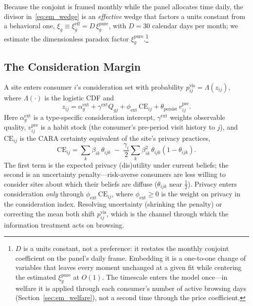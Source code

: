 \documentclass[12pt]{article}
\theoremstyle{definition}
\newcommand{\CE}{\text{CE}}
\theoremstyle{remark}
\begin{document}
Because the conjoint is framed monthly while the panel allocates time daily, the divisor in~\eqref{eq:em_wedge} is an \emph{effective} wedge that factors a units constant from a behavioral one, $\xi_g \equiv \xi^{\text{eff}}_g = D\,\xi^{\text{pure}}_g$, with $D = 30$ calendar days per month; we estimate the dimensionless paradox factor $\xi^{\text{pure}}_g$.\footnote{$D$ is a units constant, not a preference: it restates the monthly conjoint coefficient on the panel's daily frame. Embedding it is a one-to-one change of variables that leaves every moment unchanged at a given fit while centering the estimated $\xi^{\text{pure}}_g$ at $O(1)$. The timescale enters the model once---in welfare it is applied through each consumer's number of active browsing days (Section~\ref{sec:em_welfare}), not a second time through the price coefficient.}

\subsection{The Consideration Margin}

A site enters consumer $i$'s consideration set with probability $p^{\text{vis}}_{ij} = \Lambda(z_{ij})$, where $\Lambda(\cdot)$ is the logistic CDF and
\begin{equation}\label{eq:em_z}
  z_{ij} = \alpha^{\text{ext}}_g + \gamma^{\text{ext}} Q_{gj} + \phi_{\text{ext}}\, \CE_{ij} + \theta_{\text{persist}}\, v^{\text{pre}}_{ij}.
\end{equation}
Here $\alpha^{\text{ext}}_g$ is a type-specific consideration intercept, $\gamma^{\text{ext}}$ weights observable quality, $v^{\text{pre}}_{ij}$ is a habit stock (the consumer's pre-period visit history to $j$), and $\CE_{ij}$ is the CARA certainty equivalent of the site's privacy practices,
\begin{equation}\label{eq:em_ce}
  \CE_{ij} = \sum_{k} \beta_{ik}\,\theta_{ijk} \;-\; \frac{\gamma_i}{2} \sum_{k} \beta_{ik}^2\, \theta_{ijk}(1 - \theta_{ijk}).
\end{equation}
The first term is the expected privacy (dis)utility under current beliefs; the second is an uncertainty penalty---risk-averse consumers are less willing to consider sites about which their beliefs are diffuse ($\theta_{ijk}$ near $\tfrac12$). Privacy enters consideration \emph{only} through $\phi_{\text{ext}}\,\CE_{ij}$, where $\phi_{\text{ext}} \ge 0$ is the weight on privacy in the consideration index. Resolving uncertainty (shrinking the penalty) or correcting the mean both shift $p^{\text{vis}}_{ij}$, which is the channel through which the information treatment acts on browsing.
\end{document}

